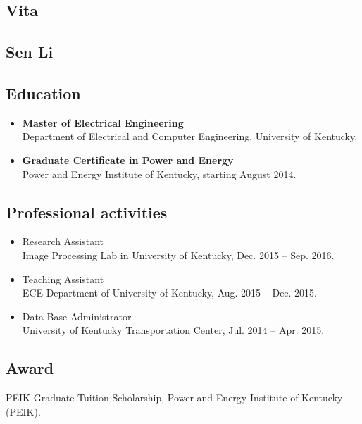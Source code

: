 \subsection{Vita}
      \vspace{\baselineskip} 
\subsection{Sen Li}
      \vspace{\baselineskip} 
\subsection{Education}
%
\begin{itemize}
   	\item \textbf{Master of Electrical Engineering}\\Department of Electrical and Computer Engineering, University of Kentucky. 
   	\item \textbf{Graduate Certificate in Power and Energy}\\ Power and Energy Institute of Kentucky, starting August 2014.
\end{itemize}

\subsection{Professional activities}
\begin{itemize}
   	\item Research Assistant\\ Image Processing Lab in University of Kentucky, Dec. 2015 -- Sep. 2016.
   	\item Teaching Assistant\\ ECE Department of University of Kentucky, Aug. 2015 -- Dec. 2015.
   	\item Data Base Administrator\\ University of Kentucky Transportation Center, Jul. 2014 -- Apr. 2015.
\end{itemize}

\subsection{Award}
PEIK Graduate Tuition Scholarship, Power and Energy Institute of Kentucky (PEIK).























